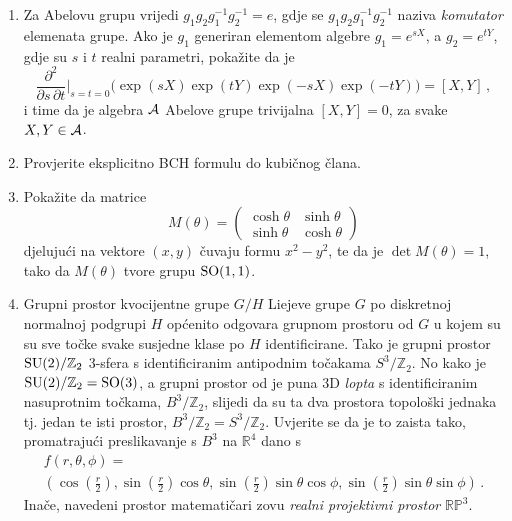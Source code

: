 \begin{enumerate}[label=\arabic{chapter}.\arabic*.]
\item \label{zad:abelovaalgebra} Za Abelovu grupu vrijedi $g_1 g_2 g_{1}^{-1} g_{2}^{-1} = e$,
    gdje se $g_1 g_2 g_{1}^{-1} g_{2}^{-1}$ naziva \emph{komutator} elemenata grupe.
    Ako je $g_1$ generiran elementom algebre $g_1 = e^{s X}$, a $g_2 = e^{t Y}$, gdje su
    $s$ i $t$ realni parametri, pokažite da je
\begin{equation}
\frac{\partial^2}{\partial s \, \partial t} \bigg|_{s=t=0} \big( \exp(sX) \exp(tY)
\exp(-sX) \exp(-tY) \big) = [X, Y] \,,
\end{equation}
i time da je algebra $\mathcal{A}$ Abelove grupe trivijalna $[X, Y] = 0$, za svake $X, Y \in \mathcal{A}$.

\item Provjerite eksplicitno BCH formulu do kubičnog člana.


\item Pokažite da matrice
\begin{equation}
 M(\theta) = \begin{pmatrix}
\cosh\theta & \sinh\theta  \\
\sinh\theta & \cosh\theta
\end{pmatrix}
\end{equation}
djelujući na vektore $(x, y)$ čuvaju formu $x^2 - y^2$, te da 
je $\det M(\theta) = 1$, tako da $M(\theta)$ tvore grupu
$\mathrm{SO}(1,1)$.
\item Grupni prostor kvocijentne grupe $G/H$ Liejeve grupe $G$ po diskretnoj normalnoj podgrupi $H$
    općenito odgovara grupnom prostoru od $G$ u kojem su su sve točke svake susjedne klase po $H$
    identificirane. Tako je grupni prostor $\mathrm{SU}(2)/\mathbb{Z}_2$ 3-sfera s identificiranim
    antipodnim točakama $S^{3}/\mathbb{Z}_2$. 
    No kako je $\mathrm{SU}(2)/\mathbb{Z}_2 = \mathrm{SO}(3)$, a grupni prostor od
     je puna 3D \emph{lopta} s identificiranim nasuprotnim točkama, $B^{3}/\mathbb{Z}_2$,
    slijedi da su ta dva prostora topološki jednaka tj. jedan te isti prostor,
    $B^{3}/\mathbb{Z}_2 = S^{3}/\mathbb{Z}_2$.
    Uvjerite se da je to zaista tako, promatrajući
    preslikavanje s $B^{3}$ na $\mathbb{R}^4$ dano s
    \begin{multline}
        f(r, \theta, \phi) = \\ \left( 
            \cos\left(\frac{r}{2}\right), 
            \sin\left(\frac{r}{2}\right)\cos\theta, 
            \sin\left(\frac{r}{2}\right)\sin\theta\cos\phi, 
            \sin\left(\frac{r}{2}\right)\sin\theta\sin\phi 
            \right) \,.
    \end{multline}
    Inače, navedeni prostor matematičari zovu \emph{realni projektivni prostor}
    $\mathbb{RP}^{3}$.
\end{enumerate}
